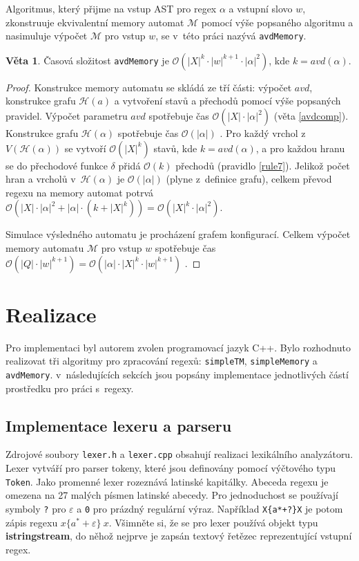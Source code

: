 \documentclass[thesis=B,czech]{FITthesis}[2019/12/23]
\theoremstyle{definition}
\newtheorem{theorem}{Věta}[chapter]
\begin{document}
	Algoritmus, který přijme na vstup AST pro regex $\alpha$ a vstupní slovo $w$, zkonstruuje ekvivalentní memory automat $\mathcal{M}$ pomocí výše popsaného algoritmu a nasimuluje výpočet $\mathcal{M}$ pro vstup $w$, se v~této práci nazývá \texttt{avdMemory}.
	\begin{theorem}
		Časová složitost \texttt{avdMemory} je $\mathcal{O}(|X|^k\cdot|w|^{k+1}\cdot|\alpha|^2)$, kde $k = avd(\alpha)$.
	\end{theorem}
	\begin{proof}
		Konstrukce memory automatu se skládá ze tří části: výpočet $avd$, konstrukce grafu $\mathcal{H}(a)$ a vytvoření stavů a přechodů pomocí výše popsaných pravidel. Výpočet parametru $avd$ spotřebuje čas $\mathcal{O}(|X|\cdot|\alpha|^2)$ (věta \ref{avdcomp}). Konstrukce grafu $\mathcal{H}(\alpha)$ spotřebuje čas $\mathcal{O}(|\alpha|)$ \cite[lemma~3]{schmidref}. Pro každý vrchol z~$V(\mathcal{H}(\alpha))$ se vytvoří $\mathcal{O}(|X|^k)$ stavů, kde $k = avd(\alpha)$, a pro každou hranu se do přechodové funkce $\delta$ přidá $\mathcal{O}(k)$ přechodů (pravidlo \ref{rule7}). Jelikož počet hran a vrcholů v~$\mathcal{H}(\alpha)$ je $\mathcal{O}(|\alpha|)$ (plyne z~definice grafu), celkem převod regexu na memory automat potrvá $\mathcal{O}(|X|\cdot|\alpha|^2 + |\alpha|\cdot(k+|X|^k)) = \mathcal{O}(|X|^k\cdot|\alpha|^2)$.
	
	Simulace výsledného automatu je procházení grafem konfigurací. Celkem výpočet memory automatu $\mathcal{M}$ pro vstup $w$ spotřebuje čas ${\mathcal{O}(|Q|\cdot|w|^{k+1})} = {\mathcal{O}(|\alpha|\cdot|X|^k\cdot|w|^{k+1})}$ \cite[lemma 3]{schmidref}.
	\end{proof}

	
\chapter{Realizace}
Pro implementaci byl autorem zvolen programovací jazyk C++. Bylo rozhodnuto realizovat tři algoritmy pro zpracování regexů: \texttt{simpleTM}, \texttt{simpleMemory} a \texttt{avdMemory}. v~následujících sekcích jsou popsány implementace jednotlivých částí prostředku pro práci s~regexy.

\section{Implementace lexeru a parseru}
Zdrojové soubory \texttt{lexer.h} a \texttt{lexer.cpp} obsahují realizaci lexikálního analyzátoru. Lexer vytváří pro parser tokeny, které jsou definovány pomocí výčtového typu \texttt{Token}. Jako promenné lexer rozeznává latinské kapitálky. Abeceda regexu je omezena na 27 malých písmen latinské abecedy. Pro jednoduchost se používají symboly \verb|?| pro $\varepsilon$ a \verb|0| pro prázdný regulární výraz. Například \verb|X{a*+?}X| je potom zápis regexu $x\{a^\ast+\varepsilon\} \ x$.
Všimněte si, že se pro lexer používá objekt typu \textbf{istringstream}, do něhož nejprve je zapsán textový řetězec reprezentující vstupní regex.
\end{document}
